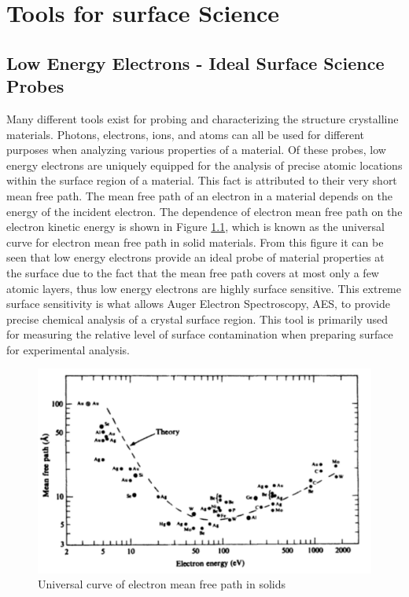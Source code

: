 \chapter{\sc Tools for surface Science}
\label{ch:Tools for surface Science}


\section{Low Energy Electrons - Ideal Surface Science Probes}
Many different tools exist for probing and characterizing the structure crystalline materials. Photons, electrons, ions, and atoms can all be used for different purposes when analyzing various properties of a material. Of these probes, low energy electrons are uniquely equipped for the analysis of precise atomic locations within the surface region of a material. This fact is attributed to their very short mean free path. The mean free path of an electron in a material depends on the energy of the incident electron. The dependence of electron mean free path on the electron kinetic energy is shown in Figure \ref{fig:univ-curve}, which is known as the universal curve for electron mean free path in solid materials. From this figure it can be seen that low energy electrons provide an ideal probe of material properties at the surface due to the fact that the mean free path covers at most only a few atomic layers, thus low energy electrons are highly surface sensitive. This extreme surface sensitivity is what allows Auger Electron Spectroscopy, AES, to provide precise chemical analysis of a crystal surface region. This tool is primarily used for measuring the relative level of surface contamination when preparing surface for experimental analysis.

\begin{figure}
\includegraphics[scale=0.35]{figs/universalcurve.png}
\caption{Universal curve of electron mean free path in solids \cite{Zangwill}}	
\label{fig:univ-curve}
\end{figure}


